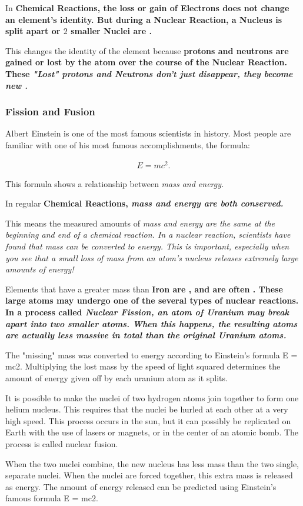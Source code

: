 
In \bf{Chemical Reactions}, the loss or gain of \bf{Electrons} does not change
an element's identity. But during a \bf{Nuclear Reaction}, a \bf{Nucleus} is
split apart or $2$ smaller \bf{Nuclei} are .

This changes the identity of the element because \bf{protons} and \bf{neutrons}
are gained or lost by the atom over the course of the \bf{Nuclear Reaction}.
These \it{"Lost"} \bf{protons} and \bf{Neutrons} don't just disappear, they
become new .


\subsubsection{Fission and Fusion}

Albert Einstein is one of the most famous scientists in history. Most people are
familiar with one of his most famous accomplishments, the formula:

\begin{align}
  E = mc^2
.\end{align}

This formula shows a relationship between \it{mass} and \it{energy}.

In regular \bf{Chemical Reactions}, \it{mass} and \it{energy} are both
conserved.

This means the measured amounts of \it{mass} and \it{energy} are the same at the
beginning and end of a chemical reaction. In a nuclear reaction, scientists have
found that \it{mass} can be converted to \it{energy}. This is important,
especially when you see that a small loss of \it{mass} from an atom's nucleus
releases extremely large amounts of energy!

Elements that have a greater mass than \bf{Iron} are , and are
often \bf{}. These large atoms may undergo one of the
several types of nuclear reactions. In a process called \it{Nuclear Fission}, an
atom of \bf{Uranium} may break apart into two smaller atoms. When this happens,
the resulting atoms are actually less massive in total than the original
\bf{Uranium} atoms.

The "missing" mass was converted to energy according to Einstein's formula E =
mc2. Multiplying the lost mass by the speed of light squared determines the
amount of energy given off by each uranium atom as it splits.

It is possible to make the nuclei of two hydrogen atoms join together to form
one helium nucleus. This requires that the nuclei be hurled at each other at a
very high speed. This process occurs in the sun, but it can possibly be
replicated on Earth with the use of lasers or magnets, or in the center of an
atomic bomb. The process is called nuclear fusion.

When the two nuclei combine, the new nucleus has less mass than the two single,
separate nuclei. When the nuclei are forced together, this extra mass is
released as energy. The amount of energy released can be predicted using
Einstein's famous formula E = mc2.

\newpage


